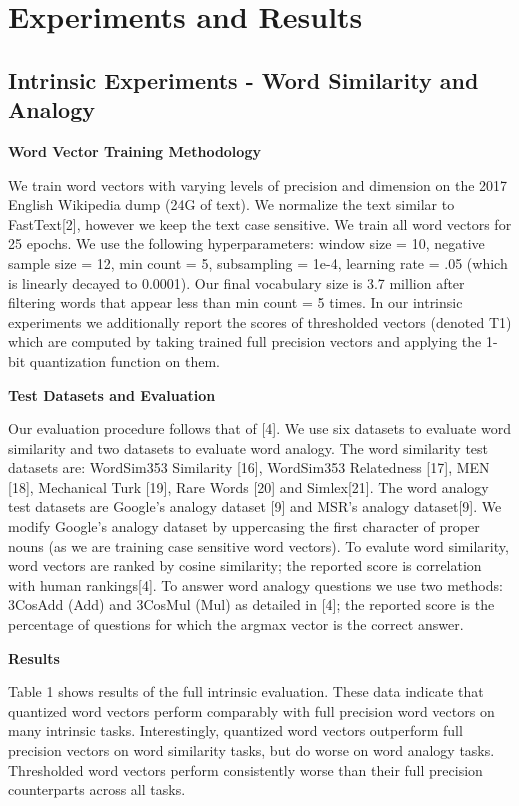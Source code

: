 \documentclass{article} %
\begin{document}
\section{Experiments and Results}
\subsection{Intrinsic Experiments - Word Similarity and Analogy}

\textbf{Word Vector Training Methodology}

We train word vectors with varying levels of precision and dimension
on the 2017 English Wikipedia dump (24G of text). We normalize the
text similar to FastText[2], however we keep the text case
sensitive. We train all word vectors for 25 epochs. We use the
following hyperparameters: window size = 10, negative sample size =
12, min count = 5, subsampling = 1e-4, learning rate = .05 (which is
linearly decayed to 0.0001). Our final vocabulary size is 3.7 million
after filtering words that appear less than min count = 5 times. In
our intrinsic experiments we additionally report the scores of
thresholded vectors (denoted T1) which are computed by taking
trained full precision vectors and applying the 1-bit quantization function
on them.

\textbf{Test Datasets and Evaluation}

Our evaluation procedure follows that of [4]. We use six datasets to
evaluate word similarity and two datasets to evaluate word
analogy. The word similarity test datasets are: WordSim353 Similarity
[16], WordSim353 Relatedness [17], MEN [18], Mechanical Turk [19], Rare
Words [20] and Simlex[21]. The word analogy test datasets are Google's
analogy dataset [9] and MSR's analogy dataset[9]. We modify Google's
analogy dataset by uppercasing the first character of proper nouns (as
we are training case sensitive word vectors). To evalute word
similarity, word vectors are ranked by cosine similarity; the reported
score is correlation with human rankings[4]. To answer word analogy
questions we use two methods: 3CosAdd (Add) and 3CosMul (Mul) as
detailed in [4]; the reported score is the percentage of questions for
which the argmax vector is the correct answer.

\textbf{Results}

Table 1 shows results of the full intrinsic evaluation. These data
indicate that quantized word vectors perform comparably with full
precision word vectors on many intrinsic tasks. Interestingly,
quantized word vectors outperform full precision vectors on word
similarity tasks, but do worse on word analogy tasks. Thresholded word
vectors perform consistently worse than their full precision
counterparts across all tasks.
\end{document}
